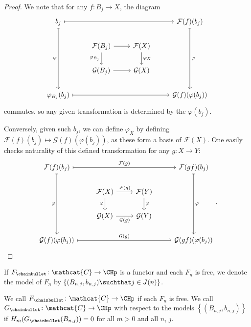 \begin{proof}
  We note that for any $f\colon B_j \to X$, the diagram
  \[
    \begin{tikzcd}
      b_j
      \ar[mapsto]{rrr}
      \ar[mapsto, swap]{ddd}{\varphi }
      &
      &
      &
      \mathcal{F}(f)(b_j)
      \ar[mapsto]{ddd}{\varphi }
      \\
      &
      \mathcal{F}(B_j)
      \ar[swap]{d}{\varphi_{B_j}}
      \ar{r}{}
      &
      \mathcal{F}(X)
      \ar{d}{\varphi _{X}}
      \\
      &
      \mathcal{G}(B_j)
      \ar[swap]{r}{}
      &
      \mathcal{G}(X)
      \\
      \varphi _{B_j}(b_j)
      \ar[mapsto]{rrr}
      &
      &
      &
      \mathcal{G}(f)(\varphi (b_j))
    \end{tikzcd}
  \]
  commutes, so any given transformation is determined by the $\varphi (b_j)$.

  Conversely, given such $b_j$, we can define $\varphi _X$ by defining
  $\mathcal{F}(f)(b_j) \mapsto \mathcal{G}(f)(\varphi (b_j))$,
  as these form a basis of $\mathcal{F}(X)$.
  One easily checks naturality of this defined transformation
  for any $g\colon  X \to  Y$:
  \[
    \begin{tikzcd}
      \mathcal{F}(f)(b_j)
      \ar[mapsto, swap]{ddd}{\varphi }
      \ar[mapsto]{rrr}{\mathcal{F}(g)}
      &
      &
      &
      \mathcal{F}(gf)(b_j)
      \ar[mapsto]{ddd}{\varphi }
      \\
      &
      \mathcal{F}(X)
      \ar{r}{\mathcal{F}(g)}
      \ar[swap]{d}{\varphi }
      &
      \mathcal{F}(Y)
      \ar{d}{\varphi }
      \\
      &
      \mathcal{G}(X)
      \ar[swap]{r}{\mathcal{G}(g)}
      &
      \mathcal{G}(Y)
      \\
      \mathcal{G}(f)(\varphi (b_j))
      \ar[mapsto]{rrr}{\mathcal{G}(g)}
      &
      &
      &
      \mathcal{G}(gf)(\varphi (b_j))
    \end{tikzcd}
  .\] 
\end{proof}

\begin{notation}
  If $F_\chainbullet \colon  \mathcat{C} \to  \CHp$ is a functor
  and each $F_n$ is free,
  we denote the model of  $F_n$ by
  $\set{ (B_{n,j}, b_{n,j}) \suchthat j\in J(n) } $.
\end{notation}

\begin{definition}
  We call $F_{\chainbullet} \colon  \mathcat{C} \to  \CHp$  if each $F_n$ is free.
  We call  $G_{\chainbullet}\colon \mathcat{C} \to  \CHp$
   with respect to the models
   $\left\{(B_{n,j}, b_{n,j})\right\} $ 
   if $H_m(G_{\chainbullet}(B_{n,j})) = 0$ for all $m>0$ and all $n$,  $j$.
\end{definition}

